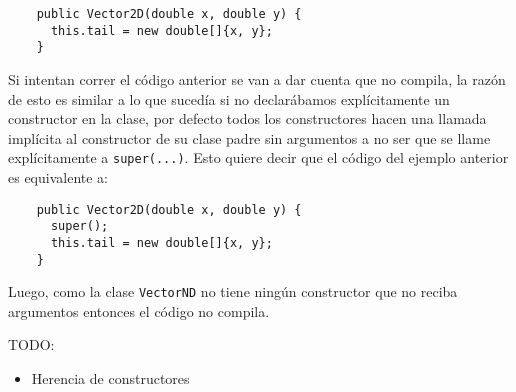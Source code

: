   \begin{verbatim}
    public Vector2D(double x, double y) {
      this.tail = new double[]{x, y};
    }
  \end{verbatim}
  
  Si intentan correr el código anterior se van a dar cuenta que no compila, la razón de esto es 
  similar a lo que sucedía si no declarábamos explícitamente un constructor en la clase, por defecto
  todos los constructores hacen una llamada implícita al constructor de su clase padre sin 
  argumentos a no ser que se llame explícitamente a \texttt{super(...)}.
  Esto quiere decir que el código del ejemplo anterior es equivalente a:

  \begin{verbatim}
    public Vector2D(double x, double y) {
      super();
      this.tail = new double[]{x, y};
    }
  \end{verbatim}

  Luego, como la clase \texttt{VectorND} no tiene ningún constructor que no reciba argumentos 
  entonces el código no compila.


  TODO:
  \begin{itemize}
    \item Herencia de constructores
  \end{itemize}
